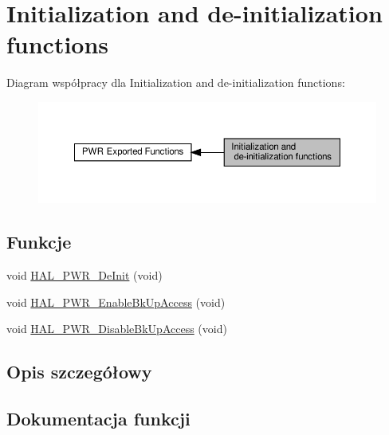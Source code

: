 \hypertarget{group___p_w_r___exported___functions___group1}{}\section{Initialization and de-\/initialization functions}
\label{group___p_w_r___exported___functions___group1}
Diagram współpracy dla Initialization and de-\/initialization functions\+:\nopagebreak
\begin{figure}[H]
\begin{center}
\leavevmode
\includegraphics[width=350pt]{group___p_w_r___exported___functions___group1}
\end{center}
\end{figure}
\subsection*{Funkcje}
\begin{DoxyCompactItemize}
\item 
void \hyperlink{group___p_w_r___exported___functions___group1_ga7edb99b94a46448c34f0301b0a077ff5}{H\+A\+L\+\_\+\+P\+W\+R\+\_\+\+De\+Init} (void)
\item 
void \hyperlink{group___p_w_r___exported___functions___group1_ga3d07cef39bf294db4aed7e06e5dbf9af}{H\+A\+L\+\_\+\+P\+W\+R\+\_\+\+Enable\+Bk\+Up\+Access} (void)
\item 
void \hyperlink{group___p_w_r___exported___functions___group1_ga1513de5f2e4b72e094fb04bab786fec8}{H\+A\+L\+\_\+\+P\+W\+R\+\_\+\+Disable\+Bk\+Up\+Access} (void)
\end{DoxyCompactItemize}


\subsection{Opis szczegółowy}


\subsection{Dokumentacja funkcji}
\mbox{\label{group___p_w_r___exported___functions___group1_ga7edb99b94a46448c34f0301b0a077ff5}} 
